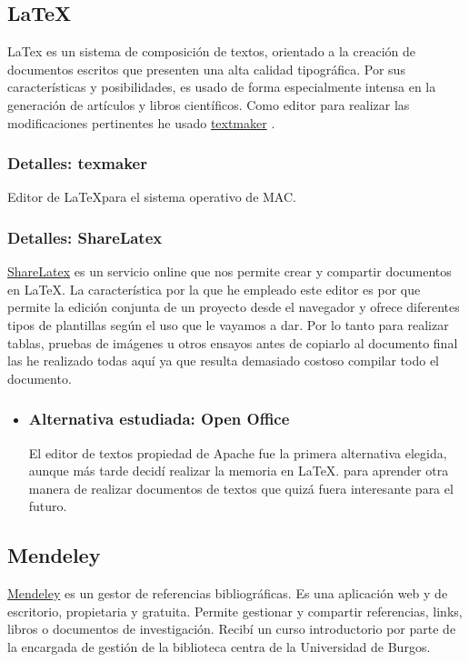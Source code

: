  \subsection{La\TeX}\label{docs_latex}
  LaTex es un sistema de composición de textos, orientado a la creación de documentos escritos que presenten una alta calidad tipográfica. Por sus características y posibilidades, es usado de forma especialmente intensa en la generación de artículos y libros científicos. Como editor para realizar las modificaciones pertinentes he usado \hyperlink{http://www.xm1math.net/texmaker/}{textmaker} .
   \subsubsection{Detalles: texmaker}
   
   Editor de La\TeX para el sistema operativo de MAC. 
  
   \subsubsection{Detalles: ShareLatex}
    \hyperlink{https://es.sharelatex.com/}{ShareLatex}  es un servicio online que nos permite crear y compartir documentos en La\TeX. La característica por la que he empleado este editor es por que  permite la edición conjunta de un proyecto desde el navegador y ofrece diferentes tipos de plantillas según el uso que le vayamos a dar. Por lo tanto para realizar tablas, pruebas de imágenes u otros ensayos antes de copiarlo al documento final las he realizado todas aquí ya que resulta demasiado costoso compilar todo el documento.
  
 \begin{itemize}
 	\item 	\subsubsection{Alternativa estudiada: Open Office}\label{openoffice}
El editor de textos propiedad de Apache fue la primera alternativa elegida, aunque más tarde decidí realizar la memoria en La\TeX. para aprender otra manera de realizar documentos de textos que quizá fuera interesante para el futuro.
\end{itemize}

 \subsection{Mendeley}\label{docs_mendeley}
  \hyperlink{www.mendeley.com/}{Mendeley} es un gestor de referencias bibliográficas. Es una aplicación web y de escritorio, propietaria y gratuita. Permite gestionar y compartir referencias, links, libros o documentos de investigación. Recibí un curso introductorio por parte de la encargada  de gestión de la biblioteca centra de la Universidad de Burgos.
  

